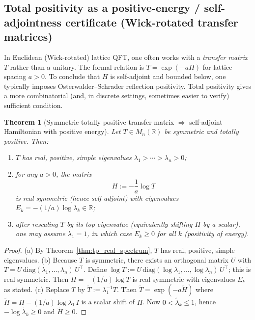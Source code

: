 \documentclass[11pt,oneside]{amsbook}
\numberwithin{equation}{section}
\theoremstyle{plain}
\newtheorem{theorem}{Theorem}[section]
\theoremstyle{definition}
\theoremstyle{remark}
\newcommand{\R}{\mathbb{R}}
\begin{document}
\subsection{Total positivity as a positive-energy / self-adjointness certificate (Wick-rotated transfer matrices)}
\label{sec:tp_positive_energy_certificate}

In Euclidean (Wick-rotated) lattice QFT, one often works with a \emph{transfer matrix} $T$ rather than a unitary.
The formal relation is $T=\exp(-aH)$ for lattice spacing $a>0$.
To conclude that $H$ is self-adjoint and bounded below, one typically imposes Osterwalder--Schrader reflection positivity.
Total positivity gives a more combinatorial (and, in discrete settings, sometimes easier to verify) sufficient condition.

\begin{theorem}[Symmetric totally positive transfer matrix $\Rightarrow$ self-adjoint Hamiltonian with positive energy]
\label{thm:tp_positive_energy}
Let $T\in M_n(\R)$ be \emph{symmetric} and totally positive.
Then:
\begin{enumerate}[label=(\alph*)]
\item $T$ has real, positive, simple eigenvalues $\lambda_1>\cdots>\lambda_n>0$;
\item for any $a>0$, the matrix
\[
H:=-\frac{1}{a}\log T
\]
is real symmetric (hence self-adjoint) with eigenvalues $E_k=-(1/a)\log\lambda_k\in\R$;
\item after rescaling $T$ by its top eigenvalue (equivalently shifting $H$ by a scalar), one may assume $\lambda_1=1$, in which case $E_k\ge 0$ for all $k$ (positivity of energy).
\end{enumerate}
\end{theorem}

\begin{proof}
(a) By Theorem~\ref{thm:tp_real_spectrum}, $T$ has real, positive, simple eigenvalues.
(b) Because $T$ is symmetric, there exists an orthogonal matrix $U$ with $T=U\,\mathrm{diag}(\lambda_1,\dots,\lambda_n)\,U^\top$.
Define $\log T:=U\,\mathrm{diag}(\log\lambda_1,\dots,\log\lambda_n)\,U^\top$; this is real symmetric.
Then $H=-(1/a)\log T$ is real symmetric with eigenvalues $E_k$ as stated.
(c) Replace $T$ by $\widetilde T:=\lambda_1^{-1}T$.
Then $\widetilde T=\exp(-a\widetilde H)$ where $\widetilde H=H-(1/a)\log\lambda_1\,I$ is a scalar shift of $H$.
Now $0<\widetilde\lambda_k\le 1$, hence $-\log\widetilde\lambda_k\ge 0$ and $\widetilde H\ge 0$.
\end{proof}
\end{document}
